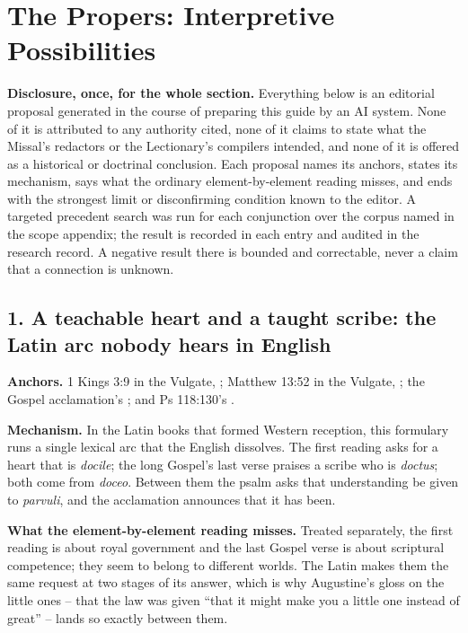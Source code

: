 \section*{The Propers: Interpretive Possibilities}

\textbf{Disclosure, once, for the whole section.} Everything below is an editorial proposal generated in the course of preparing this guide by an AI system. None of it is attributed to any authority cited, none of it claims to state what the Missal's redactors or the Lectionary's compilers intended, and none of it is offered as a historical or doctrinal conclusion. Each proposal names its anchors, states its mechanism, says what the ordinary element-by-element reading misses, and ends with the strongest limit or disconfirming condition known to the editor. A targeted precedent search was run for each conjunction over the corpus named in the scope appendix; the result is recorded in each entry and audited in the research record. A negative result there is bounded and correctable, never a claim that a connection is unknown.

\subsection*{1. A teachable heart and a taught scribe: the Latin arc nobody hears in English}

\textbf{Anchors.} 1 Kings 3:9 in the Vulgate, ; Matthew 13:52 in the Vulgate, ; the Gospel acclamation's ; and Ps 118:130's .

\textbf{Mechanism.} In the Latin books that formed Western reception, this formulary runs a single lexical arc that the English dissolves. The first reading asks for a heart that is \emph{docile}; the long Gospel's last verse praises a scribe who is \emph{doctus}; both come from \emph{doceo}. Between them the psalm asks that understanding be given to \emph{parvuli}, and the acclamation announces that it has been.

\textbf{What the element-by-element reading misses.} Treated separately, the first reading is about royal government and the last Gospel verse is about scriptural competence; they seem to belong to different worlds. The Latin makes them the same request at two stages of its answer, which is why Augustine's gloss on the little ones -- that the law was given ``that it might make you a little one instead of great'' -- lands so exactly between them.


